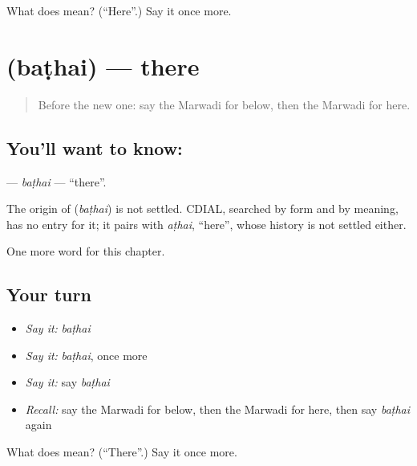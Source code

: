 \begin{tcolorbox}[breakable,colback=teal!4,colframe=teal!35!black,title={Before you move on}]
What does  mean? (\textquotedblleft{}Here\textquotedblright{}.) Say it once more.
\end{tcolorbox}
\section[\texorpdfstring{\mw{बठै} (baṭhai)}{बठै (baṭhai)}]{ (baṭhai) — there}

\label{lesson:MW-C82-bathai}



\begin{quote}
Before the new one: say the Marwadi for below, then the Marwadi for here.
\end{quote}

\subsection*{You'll want to know: }
\textbf{} — \emph{baṭhai} — \textquotedblleft{}there\textquotedblright{}.

\begin{cousinweb}
The origin of \textbf{} (\emph{baṭhai}) is not settled. CDIAL, searched by form and by meaning, has no entry for it; it pairs with \emph{aṭhai}, \textquotedblleft{}here\textquotedblright{}, whose history is not settled either.
\end{cousinweb}

\begin{grammarlens}[title={What you've built}]
One more word for this chapter.
\end{grammarlens}

\subsection*{Your turn}
\begin{itemize}
\raggedright
  \item \emph{Say it:} \emph{baṭhai}
  \item \emph{Say it:} \emph{baṭhai}, once more
  \item \emph{Say it:} say \emph{baṭhai}
  \item \emph{Recall:} say the Marwadi for below, then the Marwadi for here, then say \emph{baṭhai} again
\end{itemize}

\begin{tcolorbox}[breakable,colback=teal!4,colframe=teal!35!black,title={Before you move on}]
What does  mean? (\textquotedblleft{}There\textquotedblright{}.) Say it once more.
\end{tcolorbox}

